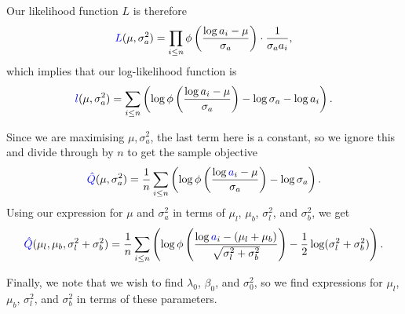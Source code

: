 \documentclass{article}
\renewcommand{\r}[1]{\textcolor{blue}{#1}}
\begin{document}
Our likelihood function $L$ is therefore
\begin{equation} \r{L}(\mu,\sigma_{a}^{2}) = \prod_{i\leq n}\phi\left(\frac{\log a_{i} -\mu}{\sigma_{a}}\right)\cdot\frac{1}{\sigma_{a}a_{i}},\end{equation}
which implies that our log-likelihood function is
\begin{equation}
\r{l}(\mu,\sigma_{a}^{2}) = \sum_{i\leq n}\left(\log\phi\left(\frac{\log{a_{i}}-\mu}{\sigma_{a}}\right)-\log{\sigma_{a}}-\log{a_{i}}\right).\end{equation}

Since we are maximising $\mu,\sigma_{a}^{2}$, the last term here is a constant, so we ignore this and divide through by $n$ to get the sample objective
\begin{equation} \r{\hat{Q}}(\mu,\sigma_{a}^{2}) = \frac{1}{n}\sum_{i\leq n}\left(\log{\phi\left(\frac{\log\r{a}_{i}-\mu}{\sigma_{a}}\right)}-\log{\sigma_{a}}\right).
\end{equation}
Using our expression for $\mu$ and $\sigma_{a}^{2}$ in terms of $\mu_{l}$, $\mu_{b}$, $\sigma_{l}^{2}$, and $\sigma_{b}^{2}$, we get
\begin{equation}\r{\hat{Q}}(\mu_{l},\mu_{b},\sigma_{l}^{2}+\sigma_{b}^{2}) = \frac{1}{n}\sum_{i\leq n}\left(\log{\phi\left(\frac{\log\r{a}_{i}-(\mu_{l}+\mu_{b})}{\sqrt{\sigma_{l}^{2}+\sigma_{b}^{2}}}\right)}-\frac{1}{2}\log(\sigma_{l}^{2}+\sigma_{b}^{2})\right).\end{equation}

Finally, we note that we wish to find $\lambda_{0}$, $\beta_{0}$, and $\sigma_{0}^{2}$, so we find expressions for $\mu_{l}$, $\mu_{b}$, $\sigma_{l}^{2}$, and $\sigma_{b}^{2}$ in terms of these parameters.
\end{document}
